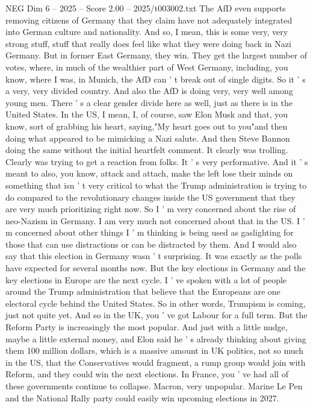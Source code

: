 \begin{textsample}{NEG Dim 6 – 2025 – Score 2.00 – 2025/t003002.txt}
The AfD even supports removing citizens of Germany that they claim have not adequately integrated into German culture and nationality.
And so, I mean, this is some very, very strong stuff, stuff that really does feel like what they were doing back in Nazi Germany.
But in former East Germany, they win.
They get the largest number of votes, where, in much of the wealthier part of West Germany, including, you know, where I was, in Munich, the AfD can ' t break out of single digits.
So it ' s a very, very divided country.
And also the AfD is doing very, very well among young men.
There ' s a clear gender divide here as well, just as there is in the United States.
In the US, I mean, I, of course, saw Elon Musk and that, you know, sort of grabbing his heart, saying,"My heart goes out to you"and then doing what appeared to be mimicking a Nazi salute.
And then Steve Bannon doing the same without the initial heartfelt comment.
It clearly was trolling.
Clearly was trying to get a reaction from folks.
It ' s very performative.
And it ' s meant to also, you know, attack and attach, make the left lose their minds on something that isn ' t very critical to what the Trump administration is trying to do compared to the revolutionary changes inside the US government that they are very much prioritizing right now.
So I ' m very concerned about the rise of neo-Nazism in Germany.
I am very much not concerned about that in the US.
I ' m concerned about other things I ' m thinking is being used as gaslighting for those that can use distractions or can be distracted by them.
And I would also say that this election in Germany wasn ' t surprising.
It was exactly as the polls have expected for several months now.
But the key elections in Germany and the key elections in Europe are the next cycle.
I ' ve spoken with a lot of people around the Trump administration that believe that the Europeans are one electoral cycle behind the United States.
So in other words, Trumpism is coming, just not quite yet.
And so in the UK, you ' ve got Labour for a full term.
But the Reform Party is increasingly the most popular.
And just with a little nudge, maybe a little external money, and Elon said he ' s already thinking about giving them 100 million dollars, which is a massive amount in UK politics, not so much in the US, that the Conservatives would fragment, a rump group would join with Reform, and they could win the next elections.
In France, you ' ve had all of these governments continue to collapse.
Macron, very unpopular.
Marine Le Pen and the National Rally party could easily win upcoming elections in 2027.

\end{textsample}
